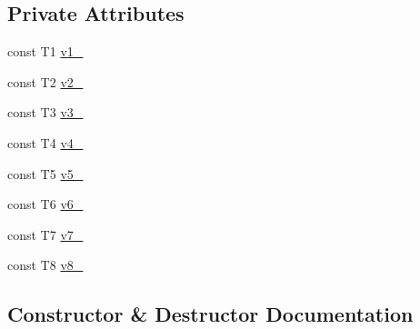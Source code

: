 \subsection*{Private Attributes}
\begin{DoxyCompactItemize}
\item 
const T1 \mbox{\hyperlink{classtesting_1_1internal_1_1_value_array8_a214b9aaebcb1018b70a3fd3f767a7162}{v1\+\_\+}}
\item 
const T2 \mbox{\hyperlink{classtesting_1_1internal_1_1_value_array8_ada6b52b0b8032567bad15caf2957b09d}{v2\+\_\+}}
\item 
const T3 \mbox{\hyperlink{classtesting_1_1internal_1_1_value_array8_a6f9c64cc69731b4571fce282297e3468}{v3\+\_\+}}
\item 
const T4 \mbox{\hyperlink{classtesting_1_1internal_1_1_value_array8_a2cfe2503edafbbc51fa07a7afa8b3986}{v4\+\_\+}}
\item 
const T5 \mbox{\hyperlink{classtesting_1_1internal_1_1_value_array8_aecf7a5e8e3c13f7d7445bd354f763669}{v5\+\_\+}}
\item 
const T6 \mbox{\hyperlink{classtesting_1_1internal_1_1_value_array8_a0041fae6f01fb44f9d25b10552d1fe94}{v6\+\_\+}}
\item 
const T7 \mbox{\hyperlink{classtesting_1_1internal_1_1_value_array8_aa339822aa12be47fe96dcf8ab2ad6976}{v7\+\_\+}}
\item 
const T8 \mbox{\hyperlink{classtesting_1_1internal_1_1_value_array8_a5b64a8805770fd11327e4a0e22b34923}{v8\+\_\+}}
\end{DoxyCompactItemize}


\subsection{Constructor \& Destructor Documentation}
\mbox{\label{classtesting_1_1internal_1_1_value_array8_aa935d771149e26694277b6b9a3f6f5d3}} 
